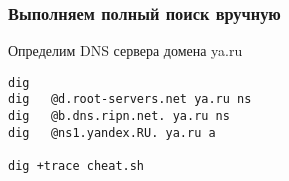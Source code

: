 \begin{frame}[fragile]
    \frametitle{Выполняем полный поиск вручную}
Определим DNS сервера домена ya.ru
\begin{lstlisting}
dig 
dig   @d.root-servers.net ya.ru ns
dig   @b.dns.ripn.net. ya.ru ns
dig   @ns1.yandex.RU. ya.ru a

dig +trace cheat.sh
\end{lstlisting}
\end{frame}